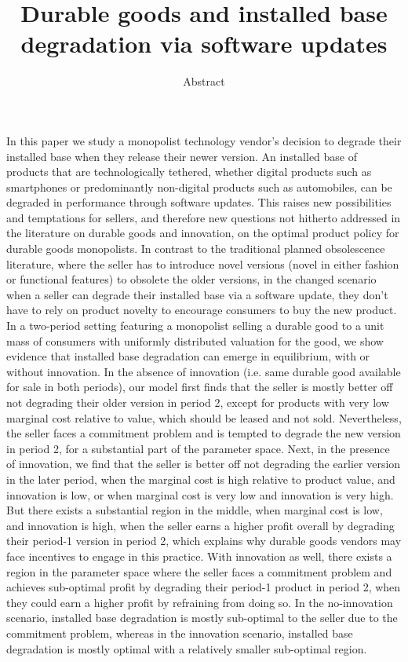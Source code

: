 \documentclass{article}
\begin{document}
\title{Durable goods and installed base degradation via software updates}
\author{Abstract}
\date{}
\maketitle

In this paper we study a monopolist technology vendor{'}s decision to degrade their installed base when they release their newer version. An installed
base of products that are technologically tethered, whether digital products such as smartphones or predominantly non-digital products such as automobiles,
can be degraded in performance through software updates. This raises new possibilities and temptations for sellers, and therefore new questions not
hitherto addressed in the literature on durable goods and innovation, on the optimal product policy for durable goods monopolists. In contrast to
the traditional planned obsolescence literature, where the seller has to introduce novel versions (novel in either fashion or functional features)
to obsolete the older versions, in the changed scenario when a seller can degrade their installed base via a software update, they don{'}t have to
rely on product novelty to encourage consumers to buy the new product. In a two-period setting featuring a monopolist selling a durable good to a
unit mass of consumers with uniformly distributed valuation for the good, we show evidence that installed base degradation can emerge in equilibrium,
with or without innovation. In the absence of innovation (i.e. same durable good available for sale in both periods), our model first finds that
the seller is mostly better off not degrading their older version in period 2, except for products with very low marginal cost relative to value,
which should be leased and not sold. Nevertheless, the seller faces a commitment problem and is tempted to degrade the new version in period 2, for
a substantial part of the parameter space. { }Next, in the presence of innovation, we find that the seller is better off not degrading the earlier
version in the later period, when the marginal cost is high relative to product value, and innovation is low, or when marginal cost is very low and
innovation is very high. But there exists a substantial region in the middle, when marginal cost is low, and innovation is high, when the seller
earns a higher profit overall by degrading their period-1 version in period 2, { }which explains why durable goods vendors may face incentives to
engage in this practice. With innovation as well, there exists a region in the parameter space where the seller faces a commitment problem and achieves
sub-optimal profit by degrading their period-1 product in period 2, when they could earn a higher profit by refraining from doing so. In the no-innovation
scenario, installed base degradation is mostly sub-optimal to the seller due to the commitment problem, whereas in the innovation scenario, installed
base degradation is mostly optimal with a relatively smaller sub-optimal region.
\end{document}
